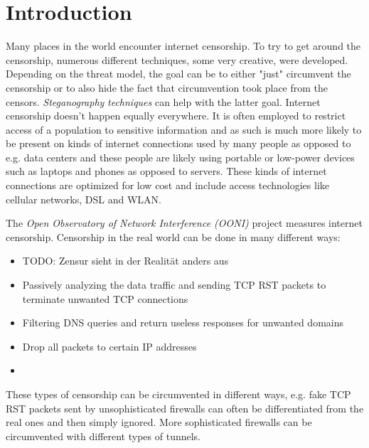 
\chapter{Introduction}


Many places in the world encounter internet censorship.
To try to get around the censorship, numerous different techniques, some very creative, were developed.
Depending on the threat model, the goal can be to either "just" circumvent the censorship or to also hide the fact that circumvention took place from the censors.
\textit{Steganography} \cite{wiki:Steganography} \textit{techniques} \cite{wiki:List_of_steganography_techniques} can help with the latter goal.
Internet censorship doesn't happen equally everywhere.
It is often employed to restrict access of a population to sensitive information and as such is much more likely to be present on kinds of internet connections used by many people as opposed to e.g. data centers and these people are likely using portable or low-power devices such as laptops and phones as opposed to servers.
These kinds of internet connections are optimized for low cost and include access technologies like cellular networks, DSL and WLAN.

The \textit{Open Observatory of Network Interference (OONI)} \cite{OONI} project measures internet censorship.
Censorship in the real world can be done in many different ways:
\begin{itemize}
  \item TODO: Zensur sieht in der Realität anders aus
  \item Passively analyzing the data traffic and sending TCP RST packets to terminate unwanted TCP connections
  \item Filtering DNS queries and return useless responses for unwanted domains
  \item Drop all packets to certain IP addresses
  \item {}
\end{itemize}
These types of censorship can be circumvented in different ways, e.g. fake TCP RST packets sent by unsophisticated firewalls can often be differentiated from the real ones and then simply ignored. More sophisticated firewalls can be circumvented with different types of tunnels.

